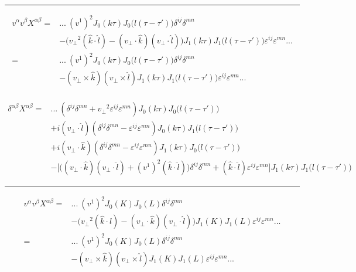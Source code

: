 \hrule

\begin{equation*}
\begin{split}
v^\alpha v^\beta X^{\alpha \beta} = & ...~ (v^1)^2 J_0 (k \tau) J_0\big(l(\tau-\tau')\big) \delta^{ij} \delta^{mn} \\
& - \Big( {v_\perp}^2 (\hat{k} \cdot \hat{l}) - (v_\perp \cdot \hat{k})(v_\perp \cdot \hat{l})\Big) J_1 (k \tau) J_1\big(l(\tau-\tau')\big) \varepsilon^{ij} \varepsilon^{mn} ... \\
= & ...~ (v^1)^2 J_0 (k \tau) J_0\big(l(\tau-\tau')\big) \delta^{ij} \delta^{mn} \\
& - (v_\perp \times \hat{k})(v_\perp \times \hat{l}) J_1 (k \tau) J_1\big(l(\tau-\tau')\big) \varepsilon^{ij} \varepsilon^{mn} ... \\
\end{split}
\end{equation*}


\begin{equation*}
\begin{split}
\delta^{\alpha \beta} X^{\alpha \beta}=& ...~ (\delta^{ij} \delta^{mn} + {v_\perp}^2 \varepsilon^{ij} \varepsilon^{mn}) J_0 (k \tau) J_0\big(l(\tau-\tau')\big) \\
& + i (v_\perp \cdot \hat{l}) (\delta^{ij} \delta^{mn} - \varepsilon^{ij} \varepsilon^{mn}) J_0 (k \tau) J_1\big(l(\tau-\tau')\big) \\
& + i (v_\perp \cdot \hat{k}) (\delta^{ij} \delta^{mn} - \varepsilon^{ij} \varepsilon^{mn}) J_1 (k \tau) J_0\big(l(\tau-\tau')\big) \\
& - \bigg[ \Big((v_\perp \cdot \hat{k}) (v_\perp \cdot \hat{l}) + (v^1)^2 (\hat{k} \cdot \hat{l}) \Big) \delta^{ij} \delta^{mn} + (\hat{k} \cdot \hat{l}) \varepsilon^{ij}\varepsilon^{mn} \bigg] J_1 (k \tau) J_1\big(l(\tau-\tau')\big) \end{split}
\end{equation*}

\hrule
\newpage
\begin{equation*}
\begin{split}
v^\alpha v^\beta X^{\alpha \beta} = & ...~ (v^1)^2 J_0 (K) J_0(L) \delta^{ij} \delta^{mn} \\
& - \Big( {v_\perp}^2 (\hat{k} \cdot \hat{l}) - (v_\perp \cdot \hat{k})(v_\perp \cdot \hat{l})\Big) J_1 (K) J_1(L) \varepsilon^{ij} \varepsilon^{mn} ... \\
= & ...~ (v^1)^2 J_0 (K) J_0(L) \delta^{ij} \delta^{mn} \\
& - (v_\perp \times \hat{k})(v_\perp \times \hat{l}) J_1 (K) J_1(L) \varepsilon^{ij} \varepsilon^{mn} ...
\end{split}
\end{equation*}

